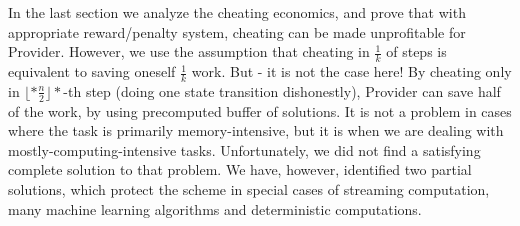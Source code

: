 \documentclass{winnower}
\begin{document}
In the last section we analyze the cheating economics, and prove that with appropriate reward/penalty system, cheating can be made unprofitable for Provider. However, we use the assumption that cheating in $\frac{1}{k}$ of steps is equivalent to saving oneself $\frac{1}{k}$ work. But - it is not the case here! By cheating only in $\lfloor*{\frac{n}{2}}\rfloor*$-th step (doing one state transition dishonestly), Provider can save half of the work, by using precomputed buffer of solutions. It is not a problem in cases where the task is primarily memory-intensive, but it is when we are dealing with mostly-computing-intensive tasks.
Unfortunately, we did not find a satisfying complete solution to that problem. We have, however, identified two partial solutions, which protect the scheme in special cases of streaming computation, many machine learning algorithms and deterministic computations.
\end{document}
